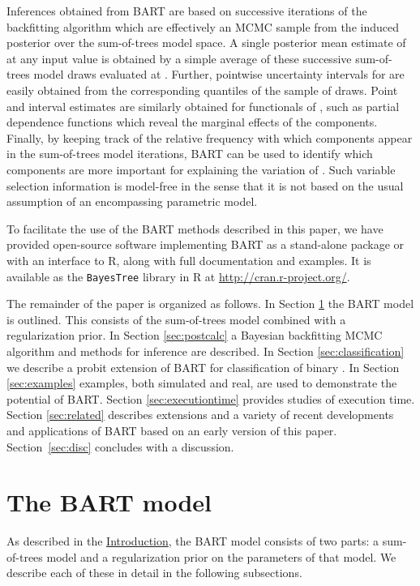 \documentclass[aoas,nameyear,dvips]{arximspdf}
\begin{document}
Inferences obtained from BART are based on successive iterations of the backfitting algorithm
which are effectively an MCMC sample from the induced posterior over the sum-of-trees model space.
A single posterior mean estimate of  at
any input value  is obtained by a simple average of these successive
sum-of-trees model draws evaluated at .  Further, pointwise uncertainty intervals for  are
easily obtained from the corresponding quantiles of the sample of draws.
Point and interval estimates are similarly obtained for functionals of , such as partial dependence functions which reveal the marginal effects
of the  components.
Finally, by keeping track of the relative frequency with
which  components appear in the sum-of-trees model iterations, BART can be used to identify
which components are more important for explaining
the variation of .  Such variable selection information is model-free in the sense that it is not based on the usual assumption of an encompassing parametric model.

To facilitate the use of the BART methods described in this paper,
we have provided open-source software implementing BART as a stand-alone package or with an
interface to R, along with full documentation and examples.  It is
available as the \texttt{BayesTree} library in R at \url{http://cran.r-project.org/}.

The remainder of the paper is organized as follows.  In Section
\ref{sec:model} the BART model is outlined.  This consists of the
sum-of-trees model combined with a regularization prior. In
Section \ref{sec:postcalc} a Bayesian backfitting MCMC algorithm
and methods for inference are described. In Section \ref{sec:classification}
we describe a probit extension of BART for classification of binary .
In Section \ref{sec:examples} examples, both simulated and real, are used to
demonstrate the potential of BART. Section \ref{sec:executiontime} provides studies of execution time.
Section \ref{sec:related} describes extensions and
a variety of recent developments and applications of BART based on an early version of
this paper.  Section~\ref{sec:disc} concludes with a discussion.

\section{The BART model}\label{sec:model}

As described in the \hyperref[sec:intro]{Introduction}, the BART model consists of two parts: a sum-of-trees model
and a regularization prior on the parameters of that model.  We describe each of these in detail in the following subsections.
\end{document}

